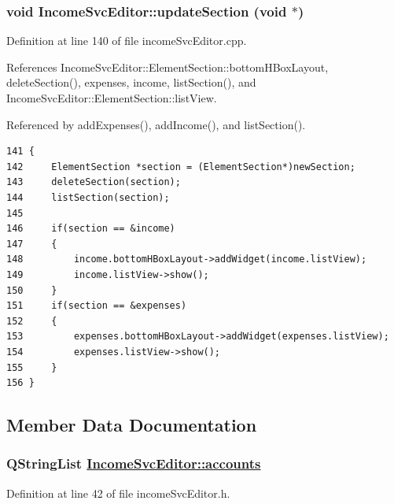 \hypertarget{classIncomeSvcEditor_k0}{
\subsubsection[updateSection]{\setlength{\rightskip}{0pt plus 5cm}void Income\-Svc\-Editor::update\-Section (void $\ast$)}}
\label{classIncomeSvcEditor_k0}


Definition at line 140 of file income\-Svc\-Editor.cpp.

References Income\-Svc\-Editor::Element\-Section::bottom\-HBox\-Layout, delete\-Section(), expenses, income, list\-Section(), and Income\-Svc\-Editor::Element\-Section::list\-View.

Referenced by add\-Expenses(), add\-Income(), and list\-Section().

\footnotesize\begin{verbatim}141 {
142     ElementSection *section = (ElementSection*)newSection;
143     deleteSection(section);
144     listSection(section);
145     
146     if(section == &income) 
147     {
148         income.bottomHBoxLayout->addWidget(income.listView);
149         income.listView->show();
150     }
151     if(section == &expenses) 
152     {
153         expenses.bottomHBoxLayout->addWidget(expenses.listView);
154         expenses.listView->show();
155     }
156 }
\end{verbatim}\normalsize 




\subsection{Member Data Documentation}
\hypertarget{classIncomeSvcEditor_r1}{
\subsubsection[accounts]{\setlength{\rightskip}{0pt plus 5cm}QString\-List \hyperlink{classIncomeSvcEditor_r1}{Income\-Svc\-Editor::accounts}}}
\label{classIncomeSvcEditor_r1}


Definition at line 42 of file income\-Svc\-Editor.h.


